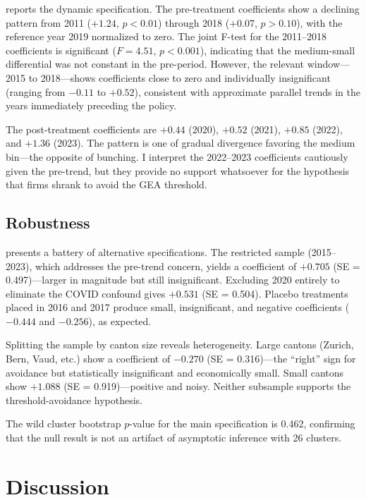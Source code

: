\documentclass[12pt]{article}
\begin{document}
 reports the dynamic specification. The pre-treatment coefficients show a declining pattern from 2011 ($+1.24$, $p < 0.01$) through 2018 ($+0.07$, $p > 0.10$), with the reference year 2019 normalized to zero. The joint F-test for the 2011--2018 coefficients is significant ($F = 4.51$, $p < 0.001$), indicating that the medium-small differential was not constant in the pre-period. However, the relevant window---2015 to 2018---shows coefficients close to zero and individually insignificant (ranging from $-0.11$ to $+0.52$), consistent with approximate parallel trends in the years immediately preceding the policy.

The post-treatment coefficients are $+0.44$ (2020), $+0.52$ (2021), $+0.85$ (2022), and $+1.36$ (2023). The pattern is one of gradual divergence favoring the medium bin---the opposite of bunching. I interpret the 2022--2023 coefficients cautiously given the pre-trend, but they provide no support whatsoever for the hypothesis that firms shrank to avoid the GEA threshold.



\subsection{Robustness}

 presents a battery of alternative specifications. The restricted sample (2015--2023), which addresses the pre-trend concern, yields a coefficient of $+0.705$ (SE = 0.497)---larger in magnitude but still insignificant. Excluding 2020 entirely to eliminate the COVID confound gives $+0.531$ (SE = 0.504). Placebo treatments placed in 2016 and 2017 produce small, insignificant, and negative coefficients ($-0.444$ and $-0.256$), as expected.

Splitting the sample by canton size reveals heterogeneity. Large cantons (Zurich, Bern, Vaud, etc.) show a coefficient of $-0.270$ (SE = 0.316)---the ``right'' sign for avoidance but statistically insignificant and economically small. Small cantons show $+1.088$ (SE = 0.919)---positive and noisy. Neither subsample supports the threshold-avoidance hypothesis.

The wild cluster bootstrap $p$-value for the main specification is 0.462, confirming that the null result is not an artifact of asymptotic inference with 26 clusters.




\section{Discussion}
\end{document}
